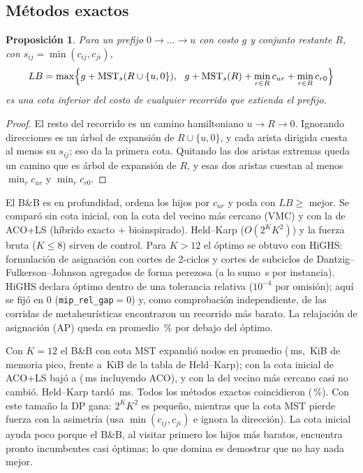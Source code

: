 \documentclass[11pt]{article}
\newtheorem{prop}{Proposición}
\theoremstyle{remark}
\begin{document}
\subsection{Métodos exactos}
\begin{prop}
Para un prefijo $0\to\dots\to u$ con costo $g$ y conjunto restante $R$, con
$s_{ij}=\min(c_{ij},c_{ji})$,
\[
LB=\max\Bigl\{g+\mathrm{MST}_s(R\cup\{u,0\}),\ \ g+\mathrm{MST}_s(R)+\min_{r\in R}c_{ur}+\min_{r\in R}c_{r0}\Bigr\}
\]
es una cota inferior del costo de cualquier recorrido que extienda el prefijo.
\end{prop}
\begin{proof}
El resto del recorrido es un camino hamiltoniano $u\to R\to0$. Ignorando direcciones es un árbol de
expansión de $R\cup\{u,0\}$, y cada arista dirigida cuesta al menos su $s_{ij}$; eso da la primera
cota. Quitando las dos aristas extremas queda un camino que es árbol de expansión de $R$, y esas dos
aristas cuestan al menos $\min_r c_{ur}$ y $\min_r c_{r0}$.
\end{proof}
El B\&B es en profundidad, ordena los hijos por $c_{ur}$ y poda con $LB\ge$ mejor. Se comparó sin
cota inicial, con la cota del vecino más cercano (VMC) y con la de ACO+LS (híbrido exacto +
bioinspirado). Held--Karp ($O(2^KK^2)$) y la fuerza bruta ($K\le8$) sirven de control. Para
$K>12$ el óptimo se obtuvo con HiGHS: formulación de asignación con cortes de 2-ciclos y cortes de
subciclos de Dantzig--Fulkerson--Johnson agregados de forma perezosa (a lo sumo \milpMaxT\,s por
instancia). HiGHS declara óptimo dentro de una tolerancia relativa ($10^{-4}$ por omisión); aquí se
fijó en 0 (\texttt{mip\_rel\_gap}$=0$) y, como comprobación independiente, \metaMasBaratas{} de las
\corridasMeta{} corridas de metaheurísticas encontraron un recorrido más barato. La relajación de asignación
(AP) queda en promedio \apGap\,\% por debajo del óptimo.

\begin{table}[t]
\centering\scriptsize
\caption{ATSP exacto con $K\le12$ ($N=100$, 10 subconjuntos de clínicas por $K$). Para Held--Karp
se reportan los estados $2^KK$; el tiempo de ``+ACO+LS'' incluye 2\,000 evaluaciones de ACO+LS.}
\label{tab:atspex}

\end{table}

Con $K=12$ el B\&B con cota MST expandió \exBbNodos{} nodos en promedio (\exBbT\,ms, \exBbMem\,KiB de memoria
pico, frente a \exHkMem\,KiB de la tabla de Held--Karp); con la cota
inicial de ACO+LS bajó a \exBbAcoNodos{} (\exBbAcoT\,ms incluyendo ACO), y con la del vecino más
cercano casi no cambió. Held--Karp tardó \exHkT\,ms. Todos los métodos exactos coincidieron
(\exTodosOk\,\%). Con este tamaño la DP gana: $2^KK^2$ es pequeño, mientras que la cota MST pierde fuerza
con la asimetría (usa $\min(c_{ij},c_{ji})$ e ignora la dirección). La cota inicial ayuda poco porque el
B\&B, al visitar primero los hijos más baratos, encuentra pronto incumbentes casi óptimas; lo que
domina es demostrar que no hay nada mejor.
\end{document}
